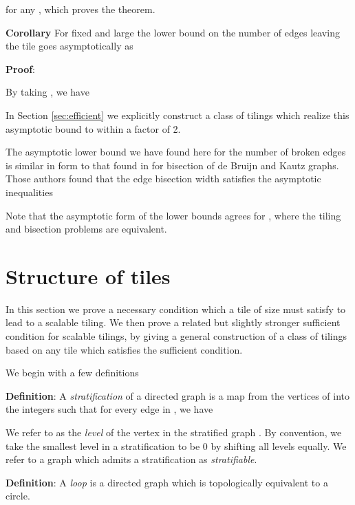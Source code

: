 \documentclass[12pt]{article}
\begin{document}
for any ,
which proves the theorem.
\vspace*{0.1in}

\noindent
{\bf Corollary}
For fixed  and large  the lower bound on
the number of edges leaving the tile goes asymptotically as


\vspace*{0.1in}
\noindent
{\bf Proof}:

By taking , we have

In Section \ref{sec:efficient} we explicitly construct a class of
tilings which realize this asymptotic bound to within a factor of 2.

The asymptotic lower bound we have found here for the number of broken
edges is similar in form to that found in \cite{rttv} for  bisection of
de Bruijn and Kautz graphs.  Those authors found that the edge
bisection width  satisfies the asymptotic inequalities

Note that the asymptotic form of the lower bounds agrees for , where the tiling and bisection problems are equivalent.



\section{Structure  of  tiles}

In this section we prove a necessary condition which a tile of size
 must satisfy to lead to a scalable tiling.  We then prove a
related but slightly stronger sufficient condition for scalable
tilings, by giving a general construction of a class of tilings based
on any tile which satisfies the sufficient condition.

We begin with a few definitions

\vspace*{0.1in}
\noindent
{\bf Definition}: A  {\it stratification} of a directed
graph  is a map
 from the vertices of  into the
integers such that for every edge  in , we have



We refer to  as the {\it level} of the vertex  in the
stratified graph .  By convention, we take the smallest level in a
stratification to be 0 by shifting all levels equally.
We refer to a graph which admits a stratification as {\it stratifiable}.
\vspace*{0.1in}

\noindent
{\bf Definition}: A {\it loop} is a directed graph
which is topologically equivalent to a circle.
\vspace*{0.1in}
\end{document}
